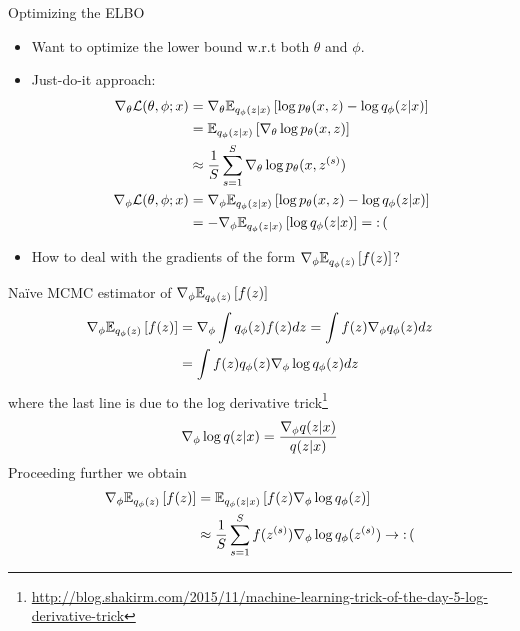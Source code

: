 \documentclass[unicode,11pt]{beamer}
\begin{document}
\begin{frame}{Optimizing the ELBO}
  \begin{itemize}
  \item Want to optimize the lower bound w.r.t both $\theta$ and $\phi$.
  \item Just-do-it approach:
    \begin{align*}
      \grad_\theta \mathcal{L}(\theta, \phi; x)
      &= \grad_\theta \E{q_\phi(z|x)}{\log p_\theta(x, z) - \log q_\phi(z|x)} \\
      &= \E{q_\phi(z|x)}{\grad_\theta \log p_\theta(x, z)} \\
      &\approx \frac{1}{S} \sum\limits_{s = 1}^S \grad_\theta \log p_\theta(x, z^{(s)}) \\
      \grad_\phi \mathcal{L}(\theta, \phi; x)
      &= \grad_\phi \E{q_\phi(z|x)}{\log p_\theta(x, z) - \log q_\phi(z|x)} \\
      &= -\grad_\phi \E{q_\phi(z|x)}{\log q_\phi(z|x)}
       = \op{:(}
    \end{align*}
  \item How to deal with the gradients of the form $\grad_\phi \E{q_\phi(z)}{f(z)}$?
  \end{itemize}
\end{frame}


\begin{frame}{Na\"ive MCMC estimator of $\grad_\phi \E{q_\phi(z)}{f(z)}$}
  \begin{align*}
    \grad_\phi \E{q_\phi(z)}{f(z)}
    &= \grad_\phi \int q_\phi(z) f(z) dz
     = \int f(z) \grad_\phi q_\phi(z) dz \\
    &= \int f(z) q_\phi(z) \grad_\phi \log q_\phi(z) dz
  \end{align*}
  where the last line is due to the log derivative
  trick\footnote{%
    \url{http://blog.shakirm.com/2015/11/machine-learning-trick-of-the-day-5-log-derivative-trick}}
  $$
  \nabla_\phi \log q(z|x) = \frac{\nabla_\phi q(z|x)}{q(z|x)}
  $$
  Proceeding further we obtain
  \begin{align*}
    \grad_\phi \E{q_\phi(z)}{f(z)}
    &= \E{q_\phi(z|x)}{f(z) \grad_\phi \log q_\phi(z)} \\
    &\approx \frac{1}{S} \sum\limits_{s = 1}^S f(z^{(s)}) \grad_\phi \log q_\phi(z^{(s)})
    \to \op{:(}
  \end{align*}

\end{frame}
\end{document}
